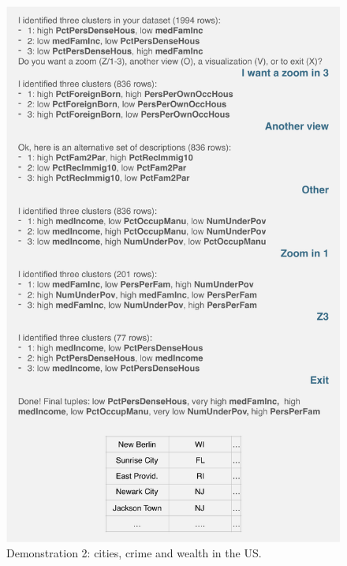 \begin{figure}[t!]
  \centering
  \includegraphics[width=\columnwidth]{Experiments/UseCase2}
  \caption{Demonstration 2: cities, crime and wealth in the US.}
  \label{fig:UseCase2}
\end{figure}
